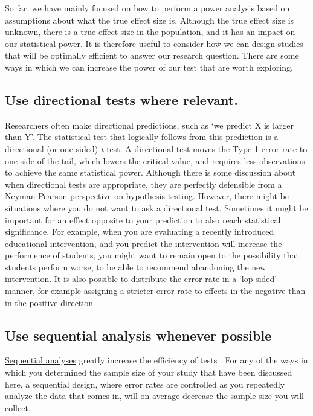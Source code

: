 \documentclass[
]{krantz}
\begin{document}
So far, we have mainly focused on how to perform a power analysis based on assumptions about what the true effect size is. Although the true effect size is unknown, there is a true effect size in the population, and it has an impact on our statistical power. It is therefore useful to consider how we can design studies that will be optimally efficient to answer our research question. There are some ways in which we can increase the power of our test that are worth exploring.

\hypertarget{use-directional-tests-where-relevant.}{%
\subsection{Use directional tests where relevant.}\label{use-directional-tests-where-relevant.}}

Researchers often make directional predictions, such as `we predict X is larger than Y'. The statistical test that logically follows from this prediction is a directional (or one-sided) \emph{t}-test. A directional test moves the Type 1 error rate to one side of the tail, which lowers the critical value, and requires less observations to achieve the same statistical power. Although there is some discussion about when directional tests are appropriate, they are perfectly defensible from a Neyman-Pearson perspective on hypothesis testing. However, there might be situations where you do not want to ask a directional test. Sometimes it might be important for an effect opposite to your prediction to also reach statistical significance. For example, when you are evaluating a recently introduced educational intervention, and you predict the intervention will increase the performence of students, you might want to remain open to the possibility that students perform worse, to be able to recommend abandoning the new intervention. It is also possible to distribute the error rate in a `lop-sided' manner, for example assigning a stricter error rate to effects in the negative than in the positive direction \citep{rice_heads_1994}.

\hypertarget{use-sequential-analysis-whenever-possible}{%
\subsection{Use sequential analysis whenever possible}\label{use-sequential-analysis-whenever-possible}}

\protect\hyperlink{ux5cux23sequential}{Sequential analyses} greatly increase the efficiency of tests \citep{lakens_performing_2014}. For any of the ways in which you determined the sample size of your study that have been discussed here, a sequential design, where error rates are controlled as you repeatedly analyze the data that comes in, will on average decrease the sample size you will collect.
\end{document}
